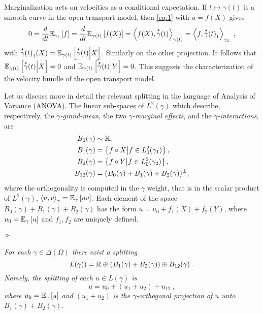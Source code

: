\documentclass[runningheads]{llncs}
\begin{document}
Marginalization acts on velocities as a conditional expectation. If $t \mapsto \gamma(t)$ is a smooth curve in the open transport model, then \cref{eq:1} with $u = f(X)$ gives \begin{equation*} 0 = \derivby t \expectat {\gamma_1} f =  \derivby t \expectat {\gamma(t)} {f(X)} = \scalarat {\gamma(t)}  {f(X)} {\velocity \gamma(t)} = \scalarat {\gamma_1}  f {{\velocity \gamma(t)}_1} \ , \end{equation*} with ${\velocity \gamma(t)}_1(X) = \condexpectat {\gamma(t)} {\velocity \gamma(t)} X$. Similarly on the other projection. It follows that $\condexpectat {\gamma(t)} {\velocity \gamma(t)} X = 0$ and $\condexpectat {\gamma(t)} {\velocity \gamma(t)} Y = 0$. This suggests the characterization of the velocity bundle of the open transport model.

Let us discuss more in detail the relevant splitting in the language of Analysis of Variance (ANOVA). The linear sub-spaces of $L^2(\gamma)$ which describe, respectively, the \emph{$\gamma$-grand-mean}, the two \emph{$\gamma$-marginal effects}, and the \emph{$\gamma$-interactions}, are
\begin{equation}\label{eq:ANOVA-spaces} \begin{aligned} B_0(\gamma) &\sim \reals, \\ B_1(\gamma) &= \setof{f\circ X}{f \in L^2_0(\gamma_1)},\\ B_2(\gamma) &= \setof{f\circ Y}{f \in L^2_0(\gamma_2)},\\ B_{12}(\gamma) &= (B_0(\gamma) + B_1(\gamma) + B_2(\gamma))^\perp, \end{aligned} \end{equation}
where the orthogonality is computed in the $\gamma$ weight, that is in the scalar product of $L^2(\gamma)$, $\scalarat \gamma u v = \expectat \gamma {uv}$. Each element of the space $B_0(\gamma) + B_1(\gamma) + B_2(\gamma)$ has the form $u = u_0 + f_1(X) + f_2(Y)$, where $u_0 = \expectat \gamma u$ and $f_1,f_2$ are uniquely defined.

\paragraph{$\bm\diamond$} \textit{For each $\gamma \in \Delta(\Omega)$ there exist a splitting
%
\begin{equation*}
%
  L(\gamma)) = \reals \oplus \left(B_1(\gamma) + B_2(\gamma)\right) \oplus B_{12}(\gamma) \ . 
\end{equation*}
%
Namely, the splitting of each $u \in L(\gamma)$ is
%
\begin{equation}
 \label{eq:ANOVA}
 u = u_0 + (u_1 + u_2) + u_{12} \ ,
\end{equation}
%
where $u_0=\expectat \gamma u$ and $(u_1+u_2)$ is the
$\gamma$-orthogonal projection of $u$ unto
$B_1(\gamma) + B_2(\gamma)$.}
\end{document}
